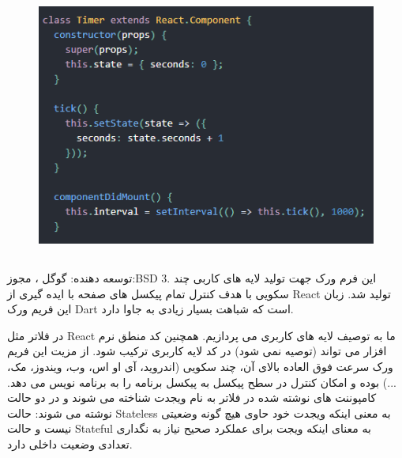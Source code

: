 \documentclass{CSICC2020}
\begin{document}
\begin{figure}[h!]
\centering\includegraphics[width=\linewidth]{Images/react-stateful}
\caption{}
\label{fig:ReactُStateful}
\end{figure}




\subsection{}
توسعه دهنده: گوگل ، مجوز:BSD 3. این فرم ورک جهت تولید لایه های کاربی چند سکویی با هدف کنترل تمام پیکسل های صفحه با ایده گیری از React تولید شد.
زبان این فریم ورک Dart است که شباهت بسیار زیادی به جاوا دارد. \cite{flutter}

در فلاتر مثل React ما به توصیف لایه های کاربری می پردازیم. همچنین کد منطق نرم افزار می تواند (توصیه نمی شود) در کد لایه کاربری ترکیب شود.
از مزیت این فریم ورک سرعت فوق العاده بالای آن، چند سکویی (اندروید، آی او اس، وب، ویندوز، مک، ...) بوده و امکان کنترل در سطح پیکسل به پیکسل برنامه را به برنامه نویس می دهد.
کامپوننت های نوشته شده در فلاتر به نام ویجدت شناخته می شوند و در دو حالت نوشته می شوند:
حالت Stateless به معنی اینکه ویجدت خود حاوی هیچ گونه وضعیتی نیست و
حالت Stateful به معنای اینکه ویجت برای عملکرد صحیح نیاز به نگداری تعدادی وضعیت داخلی دارد.
\end{document}
